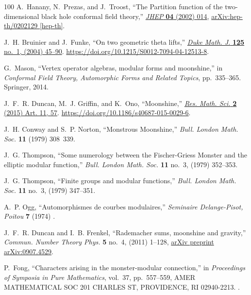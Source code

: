 \documentclass[11pt,a4paper,fontset=windows]{ctexart}
\numberwithin{equation}{section}
\begin{document}
\begin{thebibliography}{100}
A.~Hanany, N.~Prezas, and J.~Troost, ``{The Partition function of the
  two-dimensional black hole conformal field theory},''
  \href{http://dx.doi.org/10.1088/1126-6708/2002/04/014}{{\em JHEP} {\bfseries
  04} (2002) 014},
\href{http://arxiv.org/abs/hep-th/0202129}{{\ttfamily arXiv:hep-th/0202129
  [hep-th]}}.

J.~H. Bruinier and J.~Funke, ``On two geometric theta lifts,''
  \href{http://dx.doi.org/10.1215/S0012-7094-04-12513-8}{{\em Duke Math. J.}
  {\bfseries 125} no.~1, (2004) 45--90}.
  \url{https://doi.org/10.1215/S0012-7094-04-12513-8}.

G.~Mason, ``Vertex operator algebras, modular forms and moonshine,'' in {\em
  Conformal Field Theory, Automorphic Forms and Related Topics}, pp.~335--365.
\newblock Springer, 2014.

J.~F.~R. Duncan, M.~J. Griffin, and K.~Ono, ``Moonshine,''
  \href{http://dx.doi.org/10.1186/s40687-015-0029-6}{{\em Res. Math. Sci.}
  {\bfseries 2} (2015) Art. 11, 57}.
  \url{https://doi.org/10.1186/s40687-015-0029-6}.

J.~H. Conway and S.~P. Norton, ``{Monstrous Moonshine},'' {\em Bull. London
  Math. Soc.} {\bfseries 11} (1979) 308~339.

J.~G. Thompson, ``Some numerology between the {F}ischer-{G}riess {M}onster and
  the elliptic modular function,'' {\em Bull. London Math. Soc.} {\bfseries 11}
  no.~3, (1979) 352--353.

J.~G. Thompson, ``Finite groups and modular functions,'' {\em Bull. London
  Math. Soc.} {\bfseries 11} no.~3, (1979) 347--351.

A.~P. Ogg, ``Automorphismes de courbes modulaires,'' {\em Seminaire
  Delange-Pisot, Poitou} {\bfseries 7} (1974) .

J.~F.~R. Duncan and I.~B. Frenkel, ``Rademacher sums, moonshine and gravity,''
  {\em Commun. Number Theory Phys.} {\bfseries 5} no.~4, (2011) 1--128,
  \href{http://arxiv.org/abs/arXiv preprint arXiv:0907.4529}{{\ttfamily arXiv
  preprint arXiv:0907.4529}}.

P.~Fong, ``Characters arising in the monster-modular connection,'' in {\em
  Proceedings of Symposia in Pure Mathematics}, vol.~37, pp.~557--559, AMER
  MATHEMATICAL SOC 201 CHARLES ST, PROVIDENCE, RI 02940-2213.
.


\end{thebibliography}
\end{document}
